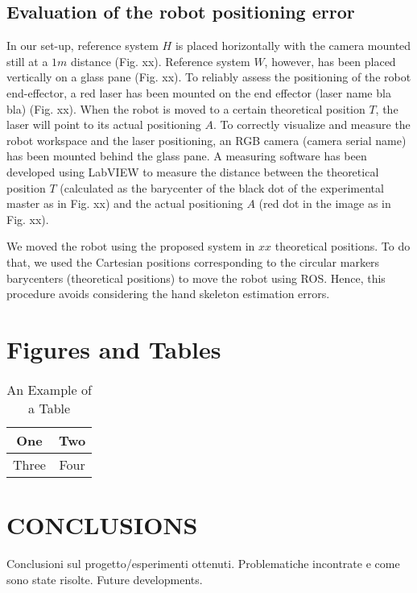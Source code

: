 \documentclass[letterpaper, 10 pt, conference]{ieeeconf}  %
\begin{document}
\subsection{Evaluation of the robot positioning error}
In our set-up, reference system $H$ is placed horizontally with the camera mounted still at a $1 m$ distance (Fig. xx). Reference system $W$, however, has been placed vertically on a glass pane (Fig. xx).
To reliably assess the positioning of the robot end-effector, a red laser has been mounted on the end effector (laser name bla bla) (Fig. xx). When the robot is moved to a certain theoretical position $T$, the laser will point to its actual positioning $A$. To correctly visualize and measure the robot workspace and the laser positioning, an RGB camera (camera serial name) has been mounted behind the glass pane.
A measuring software has been developed using LabVIEW to measure the distance between the theoretical position $T$ (calculated as the barycenter of the black dot of the experimental master as in Fig. xx) and the actual positioning $A$ (red dot in the image as in Fig. xx).

We moved the robot using the proposed system in $xx$ theoretical positions. To do that, we used the Cartesian positions corresponding to the circular markers barycenters (theoretical positions) to move the robot using ROS. Hence, this procedure avoids considering the hand skeleton estimation errors.



\section{Figures and Tables}

\begin{table}[h]
\caption{An Example of a Table}
\label{table_example}
\begin{center}
\begin{tabular}{|c||c|}
\hline
One & Two\\
\hline
Three & Four\\
\hline
\end{tabular}
\end{center}
\end{table}

\section{CONCLUSIONS}

Conclusioni sul progetto/esperimenti ottenuti.
Problematiche incontrate e come sono state risolte.
Future developments.
\end{document}
